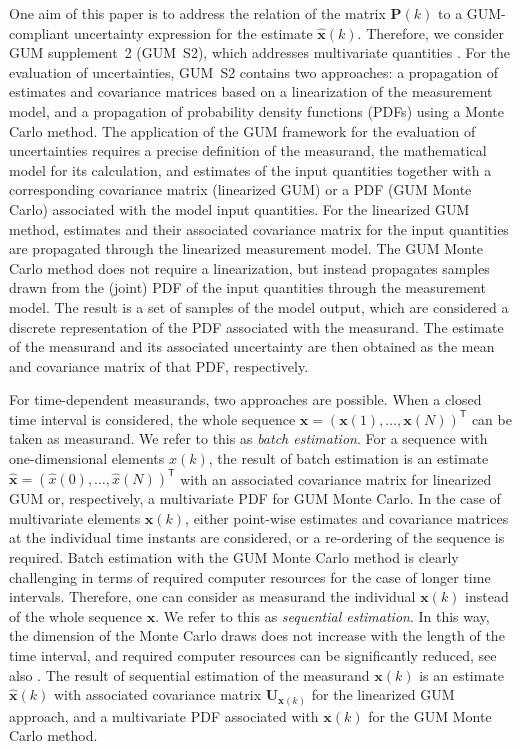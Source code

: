 \documentclass[10pt]{article}
\begin{document}
\begin{spacing}{1}
One aim of this paper is to address the relation of the matrix $\bm{P}(k)$ to a GUM-compliant uncertainty expression for the estimate $\hat{\bm{x}}(k)$. Therefore, we consider GUM supplement~2 (GUM~S2), which addresses multivariate quantities \cite{GUMS2}. For the evaluation of uncertainties, GUM~S2 contains two approaches: a propagation of estimates and covariance matrices based on a linearization of the measurement model, and a propagation of probability density functions (PDFs) using a Monte Carlo method. The application of the GUM framework for the evaluation of uncertainties requires a precise definition of the measurand, the mathematical model for its calculation, and estimates of the input quantities together with a corresponding covariance matrix (linearized GUM) or a PDF (GUM Monte Carlo) associated with the model input quantities. For the linearized GUM method, estimates and their associated covariance matrix for  the input quantities are propagated through the linearized measurement model. The GUM Monte Carlo method does not require a linearization, but instead propagates samples drawn from the (joint) PDF of the input quantities through the measurement model. The result is a set of samples of the model output, which are considered a discrete representation of the PDF associated with the measurand. The estimate of the measurand and its associated uncertainty are then obtained as the mean and covariance matrix of that PDF, respectively.

For time-dependent measurands, two approaches are possible. When a closed time interval is considered, the whole sequence $\bm{x}= \left( \bm{x}(1),\ldots,\bm{x}(N) \right)^{\mathsf{T}}$ can be taken as measurand. We refer to this as \emph{batch estimation}. For a sequence with one-dimensional elements $x(k)$, the result of batch estimation is an estimate $\hat{\bm{x}} = \left( \hat{x}(0),\ldots,\hat{x}(N) \right)^{\mathsf{T}}$ with an associated covariance matrix for linearized GUM or, respectively, a multivariate PDF for GUM Monte Carlo. In the case of multivariate elements $\bm{x}(k)$, either point-wise estimates and covariance matrices at the individual time instants are considered, or a re-ordering of the sequence is required.
Batch estimation with the GUM Monte Carlo method is clearly challenging in terms of required computer resources for the case of longer time intervals. Therefore, one can consider as measurand the individual $\bm{x}(k)$ instead of the whole sequence $\bm{x}$. We refer to this as \emph{sequential estimation}. In this way, the dimension of the Monte Carlo draws does not increase with the length of the time interval, and required computer resources can be significantly reduced, see also \cite{Eichstadt2012, Eichstadt2012Diss}. The result of sequential estimation of the measurand $\bm{x}(k)$ is an estimate $\hat{\bm{x}}(k)$ with associated covariance matrix $\bm{U}_{\bm{x}(k)}$ for the linearized GUM approach, and a multivariate PDF associated with $\bm{x}(k)$ for the GUM Monte Carlo method.



\end{spacing}
\end{document}
